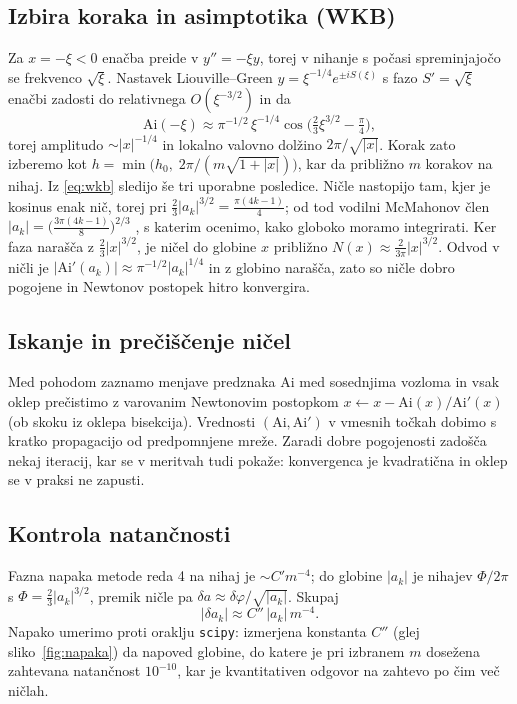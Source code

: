 \documentclass[11pt,a4paper]{article}
\begin{document}
\subsection{Izbira koraka in asimptotika (WKB)}

Za $x = -\xi < 0$ enačba preide v $y'' = -\xi y$, torej v nihanje s počasi
spreminjajočo se frekvenco $\sqrt\xi$. Nastavek Liouville--Green
$y = \xi^{-1/4} e^{\pm i S(\xi)}$ s fazo $S' = \sqrt\xi$ enačbi zadosti do
relativnega $O(\xi^{-3/2})$ in da \cite[razdelek 9.7.9]{dlmf}
\begin{equation}
  \mathrm{Ai}(-\xi) \approx \pi^{-1/2}\,\xi^{-1/4}
  \cos\!\bigl(\tfrac23 \xi^{3/2} - \tfrac{\pi}{4}\bigr),
  \label{eq:wkb}
\end{equation} 
torej amplitudo $\sim |x|^{-1/4}$ in lokalno valovno dolžino $2\pi/\sqrt{|x|}$.
Korak zato izberemo kot $h = \min\!\bigl(h_0,\; 2\pi/(m\sqrt{1+|x|})\bigr)$,
kar da približno $m$ korakov na nihaj. Iz \eqref{eq:wkb} sledijo še tri
uporabne posledice. Ničle nastopijo tam, kjer je kosinus enak nič, torej pri
$\tfrac23|a_k|^{3/2} = \tfrac{\pi(4k-1)}{4}$; od tod vodilni McMahonov člen
$|a_k| = \bigl(\tfrac{3\pi(4k-1)}{8}\bigr)^{2/3}$ \cite[razdelek 9.9.6]{dlmf},
s katerim ocenimo, kako globoko moramo integrirati. Ker faza narašča z
$\tfrac23|x|^{3/2}$, je ničel do globine $x$ približno
$N(x) \approx \tfrac{2}{3\pi}|x|^{3/2}$. Odvod v ničli je
$|\mathrm{Ai}'(a_k)| \approx \pi^{-1/2}|a_k|^{1/4}$ in z globino narašča, zato
so ničle dobro pogojene in Newtonov postopek hitro konvergira.

\subsection{Iskanje in prečiščenje ničel}

Med pohodom zaznamo menjave predznaka $\mathrm{Ai}$ med sosednjima vozloma in
vsak oklep prečistimo z varovanim Newtonovim postopkom
$x \leftarrow x - \mathrm{Ai}(x)/\mathrm{Ai}'(x)$ (ob skoku iz oklepa
bisekcija). Vrednosti $(\mathrm{Ai}, \mathrm{Ai}')$ v vmesnih točkah dobimo s
kratko propagacijo od predpomnjene mreže. Zaradi dobre pogojenosti zadošča
nekaj iteracij, kar se v meritvah tudi pokaže: konvergenca je kvadratična in
oklep se v praksi ne zapusti.

\subsection{Kontrola natančnosti}

Fazna napaka metode reda 4 na nihaj je $\sim C' m^{-4}$; do globine $|a_k|$
je nihajev $\Phi/2\pi$ s $\Phi = \tfrac23 |a_k|^{3/2}$, premik ničle pa
$\delta a \approx \delta\varphi / \sqrt{|a_k|}$. Skupaj
\begin{equation}
  |\delta a_k| \approx C''\, |a_k|\, m^{-4}.
  \label{eq:zakon}
\end{equation}
Napako umerimo proti oraklju \texttt{scipy}: izmerjena konstanta $C''$ (glej
sliko~\ref{fig:napaka}) da napoved globine, do katere je pri izbranem $m$
dosežena zahtevana natančnost $10^{-10}$, kar je kvantitativen odgovor na
zahtevo po čim več ničlah.
\end{document}
